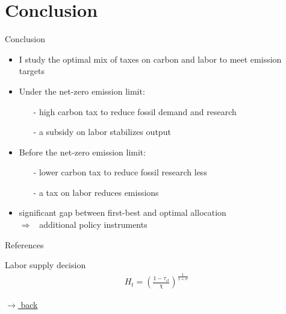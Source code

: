 \documentclass[11pt,aspectratio=169]{beamer}
\newcommand{\ar}{$\Rightarrow$ \ }
\begin{document}
\section{Conclusion}
\begin{frame}{Conclusion}
\begin{itemize}[<+-| alert@+>]
	\item I study the optimal mix of taxes on carbon and labor to meet emission targets
	\vspace{3mm}
	\item Under the net-zero emission limit: 
	\begin{itemize}
		\item[-] high carbon tax to reduce fossil demand and research
		\item[-]  a subsidy on labor stabilizes output
	\end{itemize}
	\vspace{3mm}
	\item Before the net-zero emission limit: 
	\begin{itemize}
		\item[-]  lower carbon tax to reduce fossil research less
		\item[-] a tax on labor reduces emissions
	\end{itemize}
\item significant gap between first-best and optimal allocation\\ \ar additional policy instruments
\end{itemize}
\end{frame}
\begin{frame}[shrink]{References}



\end{frame}



\appendix

\begin{frame}{Labor supply decision}
\hypertarget{labsup}{}
\begin{align*}
	H_t=\left(\frac{1-\tau_{\iota t}}{\chi}\right)^{\frac{1}{1+\sigma}}
\end{align*}

\vfill
\vspace{0mm}
\hfill 
\hyperlink{hhopt}{\tiny{$\rightarrow$ back}}
\end{frame}
\end{document}
